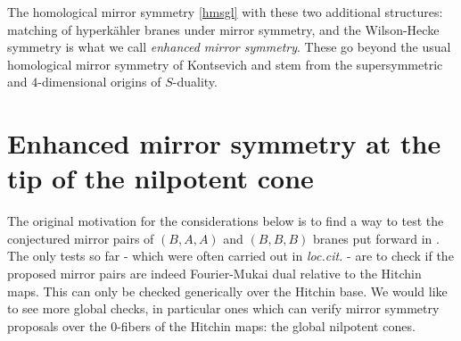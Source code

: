 \documentclass[12pt]{article}
\numberwithin{equation}{section}
\theoremstyle{remark}
\numberwithin{theorem}{section}
\numberwithin{equation}{section}
\begin{document}
The homological mirror symmetry \eqref{hmsgl} with these two additional structures: matching of hyperk\"ahler branes under mirror symmetry, and the Wilson-Hecke symmetry is what we call {\em enhanced mirror symmetry}. These go beyond the usual homological mirror symmetry of Kontsevich and stem from the supersymmetric and $4$-dimensional origins of $S$-duality.  



\section{Enhanced mirror symmetry at the tip of the nilpotent cone}\label{enhanced}

The original motivation for the considerations below is to find a way to test the conjectured mirror pairs of $(B,A,A)$ and $(B,B,B)$ branes put forward in \cite{baraglia-schaposnik,garcia-prada-etal,hitchin-characteristic}. The only tests so far - which were often carried out in {\em loc.cit.} -  are to check if the proposed mirror pairs are indeed  Fourier-Mukai dual relative to the Hitchin maps. This can only be checked generically over the Hitchin base. We would like to see more global checks, in particular ones which can verify mirror symmetry proposals over the $0$-fibers of the Hitchin maps: the global nilpotent cones.  
\end{document}
